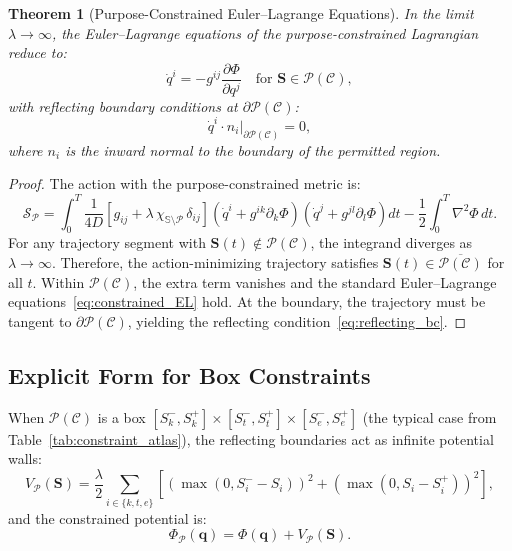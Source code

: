 \documentclass[aps,prd,twocolumn,superscriptaddress,floatfix,nofootinbib]{revtex4-2}
\newtheorem{theorem}{Theorem}[section]
\theoremstyle{remark}
\newcommand{\Sk}{S_k}
\newcommand{\St}{S_t}
\newcommand{\Se}{S_e}
\newcommand{\Svec}{\mathbf{S}}
\newcommand{\qvec}{\mathbf{q}}
\newcommand{\Action}{\mathcal{S}}
\newcommand{\Pot}{\Phi}
\newcommand{\Purpose}{\mathcal{P}}
\newcommand{\Context}{\mathcal{C}}
\newcommand{\Sspace}{\mathbb{S}}
\begin{document}
\begin{theorem}[Purpose-Constrained Euler--Lagrange Equations]
\label{thm:constrained_EL}
In the limit $\lambda \to \infty$, the Euler--Lagrange equations of the purpose-constrained Lagrangian reduce to:
\begin{equation}
\dot{q}^i = -g^{ij}\frac{\partial \Pot}{\partial q^j} \quad \text{for } \Svec \in \Purpose(\Context),
\label{eq:constrained_EL}
\end{equation}
with reflecting boundary conditions at $\partial \Purpose(\Context)$:
\begin{equation}
\dot{q}^i \cdot n_i\big|_{\partial \Purpose(\Context)} = 0,
\label{eq:reflecting_bc}
\end{equation}
where $n_i$ is the inward normal to the boundary of the permitted region.
\end{theorem}

\begin{proof}
The action with the purpose-constrained metric is:
\[
\Action_\Purpose = \int_0^T \frac{1}{4D} \left[g_{ij} + \lambda\,\chi_{\Sspace \setminus \Purpose}\,\delta_{ij}\right] \left(\dot{q}^i + g^{ik}\partial_k\Pot\right)\left(\dot{q}^j + g^{jl}\partial_l\Pot\right) dt - \frac{1}{2}\int_0^T \nabla^2\Pot\,dt.
\]
For any trajectory segment with $\Svec(t) \notin \Purpose(\Context)$, the integrand diverges as $\lambda \to \infty$.
Therefore, the action-minimizing trajectory satisfies $\Svec(t) \in \overline{\Purpose(\Context)}$ for all $t$.
Within $\Purpose(\Context)$, the extra term vanishes and the standard Euler--Lagrange equations~\eqref{eq:constrained_EL} hold.
At the boundary, the trajectory must be tangent to $\partial \Purpose(\Context)$, yielding the reflecting condition~\eqref{eq:reflecting_bc}.
\end{proof}

\subsection{Explicit Form for Box Constraints}

When $\Purpose(\Context)$ is a box $[\Sk^-, \Sk^+] \times [\St^-, \St^+] \times [\Se^-, \Se^+]$ (the typical case from Table~\ref{tab:constraint_atlas}), the reflecting boundaries act as infinite potential walls:
\begin{equation}
V_\Purpose(\Svec) = \frac{\lambda}{2} \sum_{i \in \{k,t,e\}} \left[(\max(0, S_i^- - S_i))^2 + (\max(0, S_i - S_i^+))^2\right],
\label{eq:box_potential}
\end{equation}
and the constrained potential is:
\begin{equation}
\Pot_\Purpose(\qvec) = \Pot(\qvec) + V_\Purpose(\Svec).
\end{equation}
\end{document}
